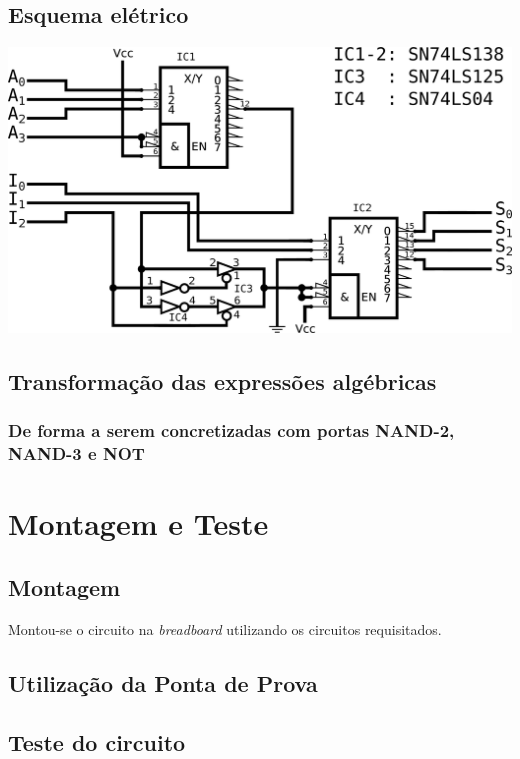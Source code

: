 \documentclass[a4paper,12pt]{article}
\begin{document}
\subsection{Esquema elétrico}
\includegraphics[scale=.1]{esqelect.eps}

\subsection{Transformação das expressões algébricas}

\subsubsection{De forma a serem concretizadas com portas NAND-2, NAND-3 e NOT}


\section{Montagem e Teste}
\subsection{Montagem}
Montou-se o circuito na {\it breadboard} utilizando os circuitos requisitados.
\subsection{Utilização da Ponta de Prova}
\pagebreak
\subsection{Teste do circuito}
\end{document}
